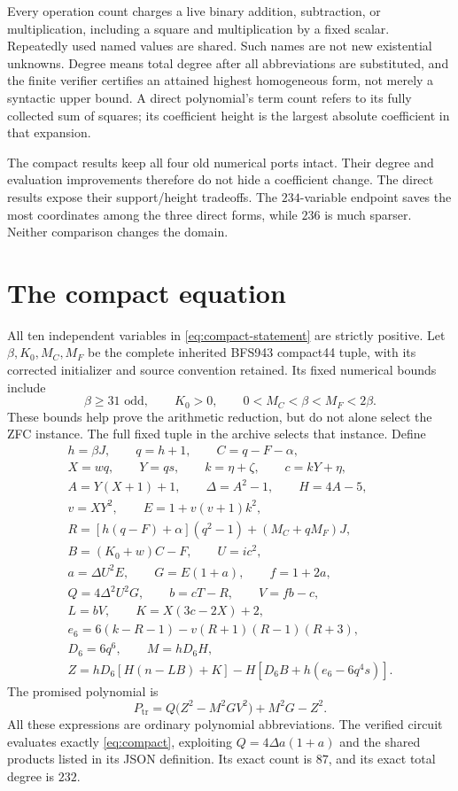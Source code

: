 \documentclass[11pt]{article}
\theoremstyle{definition}
\begin{document}
Every operation count charges a live binary addition, subtraction, or
multiplication, including a square and multiplication by a fixed scalar.
Repeatedly used named values are shared. Such names are not new existential
unknowns. Degree means total degree after all abbreviations are substituted,
and the finite verifier certifies an attained highest homogeneous form,
not merely a syntactic upper bound. A direct polynomial's term count
refers to its fully collected sum of squares; its coefficient height is
the largest absolute coefficient in that expansion.

The compact results keep all four old numerical ports intact. Their
degree and evaluation improvements therefore do not hide a coefficient
change. The direct results expose their support/height tradeoffs. The
$234$-variable endpoint saves the most coordinates among the three direct
forms, while $236$ is much sparser. Neither comparison changes the domain.

\section{The compact equation}\label{sec:compact}

All ten independent variables in \eqref{eq:compact-statement} are strictly
positive. Let $\beta,K_0,M_C,M_F$ be the complete inherited BFS943 compact44
tuple, with its corrected initializer and source convention retained. Its
fixed numerical bounds include
\[
 \beta\ge31\text{ odd},\qquad K_0>0,\qquad
 0<M_C<\beta<M_F<2\beta.
\]
These bounds help prove the arithmetic reduction, but do not alone select
the ZFC instance. The full fixed tuple in the archive selects that instance.
Define
\begin{gather*}
 h=\beta J,\qquad q=h+1,\qquad C=q-F-\alpha,\\
 X=wq,\qquad Y=qs,\qquad k=\eta+\zeta,\qquad c=kY+\eta,\\
 A=Y(X+1)+1,\qquad \Delta=A^2-1,\qquad H=4A-5,\\
 v=XY^2,\qquad E=1+v(v+1)k^2,\\
 R=[h(q-F)+\alpha](q^2-1)+(M_C+qM_F)J,\\
 B=(K_0+w)C-F,\qquad U=ic^2,\\
 a=\Delta U^2E,\qquad G=E(1+a),\qquad f=1+2a,\\
 Q=4\Delta^2U^2G,\qquad b=cT-R,\qquad V=fb-c,\\
 L=bV,\qquad K=X(3c-2X)+2,\\
 e_6=6(k-R-1)-v(R+1)(R-1)(R+3),\\
 D_6=6q^6,\qquad M=hD_6H,\\
 Z=hD_6[H(n-LB)+K]-H[D_6B+h(e_6-6q^4s)].
\end{gather*}
The promised polynomial is
\begin{equation}\label{eq:compact}
 \boxed{\quad P_{\mathrm{tr}}
 =Q\bigl(Z^2-M^2GV^2\bigr)+M^2G-Z^2.\quad}
\end{equation}
All these expressions are ordinary polynomial abbreviations. The
verified circuit evaluates exactly \eqref{eq:compact}, exploiting
$Q=4\Delta a(1+a)$ and the shared products listed in its JSON definition.
Its exact count is $87$, and its exact total degree is $232$.
\end{document}
